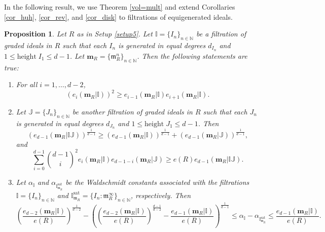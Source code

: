 \documentclass[12pt,a4paper]{amsart}
\theoremstyle{plain}
\newtheorem{proposition}[theorem]{Proposition}
\theoremstyle{definition}
\numberwithin{equation}{theorem}
\begin{document}
In the following result, we use Theorem \ref{vol=mult} and extend Corollaries \ref{cor_huh}, \ref{cor_rev}, and \ref{cor_disk} to filtrations of equigenerated ideals.

\begin{proposition}\label{prop_filt}
 Let $R$ as in Setup \ref{setup5}. Let $\mathbb{I}=\{I_n\}_{n\in\mathbb{N}}$ be a filtration of graded ideals in $R$ such that each $I_n$ is generated in equal degrees $d_{I_n}$ and $1\leq \mathrm{height}\;I_1 \leq d-1$. Let $\mathbf{m}_R = \{\mathfrak{m}_R^n\}_{n\in\mathbb{N}}$. Then the following statements are true:
 \begin{enumerate}
  \item[$(i)$] For all $i=1,\ldots,d-2$, $${\left(e_i\left(\mathbf{m}_R \vert \mathbb{I}\right)\right)}^2 \geq e_{i-1}\left(\mathbf{m}_R \vert \mathbb{I}\right) e_{i+1}\left(\mathbf{m}_R \vert \mathbb{I}\right).$$
  \item[$(ii)$] Let $\mathbb{J}=\{J_n\}_{n\in\mathbb{N}}$ be another filtration of graded ideals in $R$ such that each $J_n$ is generated in equal degrees $d_{J_n}$ and $1\leq \mathrm{height}\;J_1 \leq d-1$. Then $${\left(e_{d-1}\left(\mathbf{m}_R \vert \mathbb{IJ}\right)\right)}^{\tfrac{1}{d-1}} \geq {\left(e_{d-1}\left(\mathbf{m}_R \vert \mathbb{I}\right)\right)}^{\tfrac{1}{d-1}} + {\left(e_{d-1}\left(\mathbf{m}_R \vert \mathbb{J}\right)\right)}^{\tfrac{1}{d-1}},$$
  and $$\sum_{i=0}^{d-1} {\binom{d-1}{i}}^2 e_{i}\left(\mathbf{m}_R \vert \mathbb{I}\right) e_{d-1-i}\left(\mathbf{m}_R \vert \mathbb{J}\right) \geq e(R) e_{d-1}\left(\mathbf{m}_R \vert \mathbb{IJ}\right).$$
  \item[$(iii)$] Let $\alpha_{\mathbb{I}}$ and $\alpha_{\mathbb{I}^{\mathrm{sat}}_{\mathfrak{m}_R}}$ be the Waldschmidt constants associated with the filtrations $\mathbb{I}=\{I_n\}_{n\in\mathbb{N}}$ and $\mathbb{I}^{\mathrm{sat}}_{\mathfrak{m}_R} = \{I_n : \mathfrak{m}_R^{\infty}\}_{n\in\mathbb{N}}$, respectively. Then
  $${\left(\dfrac{e_{d-2}\left(\mathbf{m}_R \vert \mathbb{I}\right)}{e(R)}\right)}^{\tfrac{1}{d-2}} - {\left({\left(\dfrac{e_{d-2}\left(\mathbf{m}_R \vert \mathbb{I}\right)}{e(R)}\right)}^{\tfrac{d-1}{d-2}} - \dfrac{e_{d-1}\left(\mathbf{m}_R \vert \mathbb{I}\right)}{e(R)}\right)}^{\tfrac{1}{d-1}} \leq \alpha_{\mathbb{I}} - \alpha_{\mathbb{I}^{\mathrm{sat}}_{\mathfrak{m}_R}} \leq \dfrac{e_{d-1}\left(\mathbf{m}_R \vert \mathbb{I}\right)}{e(R)}.$$
 \end{enumerate}
\end{proposition}
\end{document}
